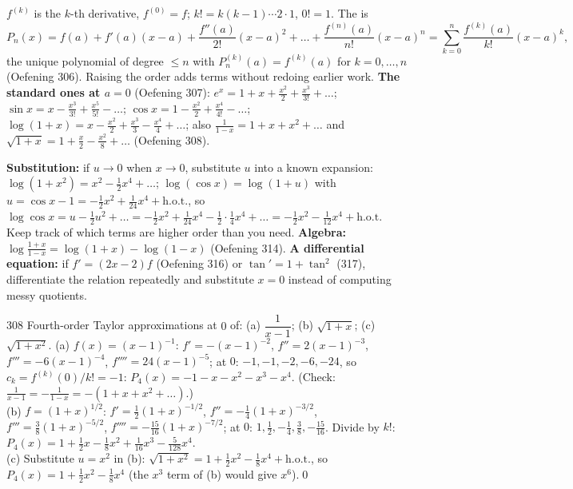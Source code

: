 \begin{key}
$f^{(k)}$ is the $k$-th derivative, $f^{(0)}=f$; $k!=k(k-1)\cdots2\cdot1$, $0!=1$. The  is
\[
P_n(x)=f(a)+f'(a)(x-a)+\frac{f''(a)}{2!}(x-a)^2+\dots+\frac{f^{(n)}(a)}{n!}(x-a)^n=\sum_{k=0}^n\frac{f^{(k)}(a)}{k!}(x-a)^k,
\]
the unique polynomial of degree $\le n$ with $P_n^{(k)}(a)=f^{(k)}(a)$ for $k=0,\dots,n$ (Oefening 306). Raising the order adds terms without redoing earlier work. \textbf{The standard ones at $a=0$} (Oefening 307): $e^x=1+x+\frac{x^2}2+\frac{x^3}{3!}+\dots$; $\sin x=x-\frac{x^3}{3!}+\frac{x^5}{5!}-\dots$; $\cos x=1-\frac{x^2}2+\frac{x^4}{4!}-\dots$; $\log(1+x)=x-\frac{x^2}2+\frac{x^3}3-\frac{x^4}4+\dots$; also $\frac1{1-x}=1+x+x^2+\dots$ and $\sqrt{1+x}=1+\frac x2-\frac{x^2}8+\dots$ (Oefening 308).
\end{key}
\begin{strategy}
\textbf{Substitution:} if $u\to0$ when $x\to0$, substitute $u$ into a known expansion: $\log(1+x^2)=x^2-\frac12x^4+\dots$; $\log(\cos x)=\log(1+u)$ with $u=\cos x-1=-\frac12x^2+\frac1{24}x^4+\text{h.o.t.}$, so $\log\cos x=u-\frac12u^2+\dots=-\frac12x^2+\frac1{24}x^4-\frac12\cdot\frac14x^4+\dots=-\frac12x^2-\frac1{12}x^4+\text{h.o.t.}$ Keep track of which terms are higher order than you need. \textbf{Algebra:} $\log\frac{1+x}{1-x}=\log(1+x)-\log(1-x)$ (Oefening 314). \textbf{A differential equation:} if $f'=(2x-2)f$ (Oefening 316) or $\tan'=1+\tan^2$ (317), differentiate the relation repeatedly and substitute $x=0$ instead of computing messy quotients.
\end{strategy}

\begin{bookex}{308}
Fourth-order Taylor approximations at $0$ of: (a) $\dfrac1{x-1}$; (b) $\sqrt{1+x}$; (c) $\sqrt{1+x^2}$.
\solution
(a) $f(x)=(x-1)^{-1}$: $f'=-(x-1)^{-2}$, $f''=2(x-1)^{-3}$, $f'''=-6(x-1)^{-4}$, $f''''=24(x-1)^{-5}$; at $0$: $-1,-1,-2,-6,-24$, so $c_k=f^{(k)}(0)/k!=-1$: $P_4(x)=-1-x-x^2-x^3-x^4$. (Check: $\frac1{x-1}=-\frac1{1-x}=-(1+x+x^2+\dots)$.)\\
(b) $f=(1+x)^{1/2}$: $f'=\frac12(1+x)^{-1/2}$, $f''=-\frac14(1+x)^{-3/2}$, $f'''=\frac38(1+x)^{-5/2}$, $f''''=-\frac{15}{16}(1+x)^{-7/2}$; at $0$: $1,\frac12,-\frac14,\frac38,-\frac{15}{16}$. Divide by $k!$: $P_4(x)=1+\frac12x-\frac18x^2+\frac1{16}x^3-\frac5{128}x^4$.\\
(c) Substitute $u=x^2$ in (b): $\sqrt{1+x^2}=1+\frac12x^2-\frac18x^4+\text{h.o.t.}$, so $P_4(x)=1+\frac12x^2-\frac18x^4$ (the $x^3$ term of (b) would give $x^6$).\qed
\end{bookex}

